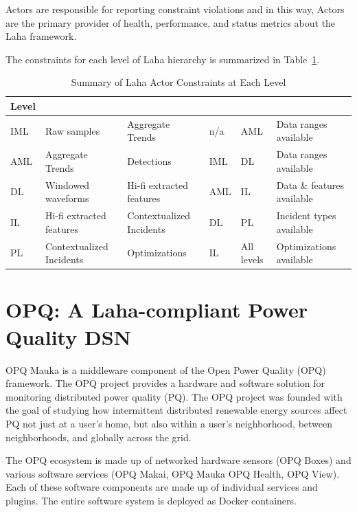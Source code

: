 Actors are responsible for reporting constraint violations and in this way, Actors are the primary provider of health, performance, and status metrics about the Laha framework.

The constraints for each level of Laha hierarchy is summarized in Table~\ref{actor-constraint-table}.

\begin{table}[h]
	\centering
	\caption{Summary of Laha Actor Constraints at Each Level}
	\begin{tabularx}{\textwidth}{lXXllX}
		\toprule
		\textbf{Level} & \boldmath{$A_i$} & \boldmath{$Ao$} & \boldmath{$A_{ai}$} & \boldmath{$A_{ao}$} & \boldmath{$A_p$} \\
		\midrule
		IML & Raw samples & Aggregate Trends & n/a & AML & Data ranges available \\
		AML & Aggregate Trends & Detections & IML & DL & Data ranges available \\
		DL & Windowed waveforms & Hi-fi extracted features & AML & IL & Data \& features available \\
		IL & Hi-fi extracted features & Contextualized Incidents & DL & PL & Incident types available \\
		PL & Contextualized Incidents & Optimizations & IL & All levels & Optimizations available \\
		\bottomrule
	\end{tabularx}
	\label{actor-constraint-table}
\end{table}

\section{OPQ: A Laha-compliant Power Quality DSN}\label{sec:opq:-a-laha-compliant-power-quality-dsn}
OPQ Mauka is a middleware component of the Open Power Quality (OPQ) framework. The OPQ project provides a hardware and software solution for monitoring distributed power quality (PQ). The OPQ project was founded with the goal of studying how intermittent distributed renewable energy sources affect PQ not just at a user's home, but also within a user's neighborhood, between neighborhoods, and globally across the grid.

The OPQ ecosystem is made up of networked hardware sensors (OPQ Boxes) and various software services (OPQ Makai, OPQ Mauka OPQ Health, OPQ View). Each of these software components are made up of individual services and plugins. The entire software system is deployed as Docker containers.

